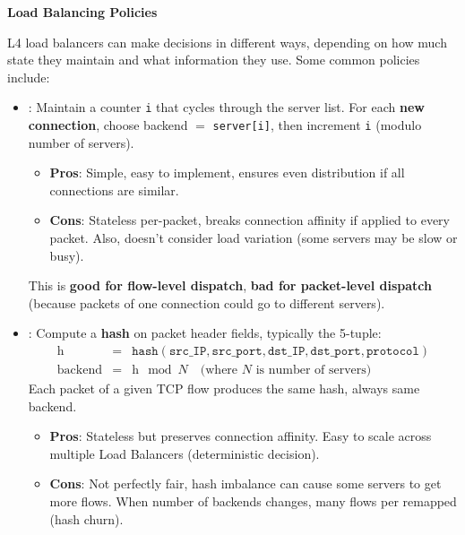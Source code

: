 \highspace
\begin{flushleft}
    \textcolor{Green3}{ \textbf{Load Balancing Policies}}
\end{flushleft}
L4 load balancers can make decisions in different ways, depending on how much state they maintain and what information they use. Some common policies include:
\begin{itemize}
    \item {}: Maintain a counter \texttt{i} that cycles through the server list. For each \textbf{new connection}, choose backend $=$ \texttt{server[i]}, then increment \texttt{i} (modulo number of servers).
    \begin{itemize}
        \item[\textcolor{Green3}{\faIcon{check}}] \textcolor{Green3}{\textbf{Pros}}: Simple, easy to implement, ensures even distribution if all connections are similar.
        \item[\textcolor{Red2}{\faIcon{times}}] \textcolor{Red2}{\textbf{Cons}}: Stateless per-packet, breaks connection affinity if applied to every packet. Also, doesn't consider load variation (some servers may be slow or busy).
    \end{itemize}
    This is \textbf{good for flow-level dispatch}, \textbf{bad for packet-level dispatch} (because packets of one connection could go to different servers).


    \item {}: Compute a \textbf{hash} on packet header fields, typically the 5-tuple:
    \begin{equation*}
        \begin{array}{rcl}
            \text{h} & = & \texttt{hash}\left(\texttt{src\_IP}, \texttt{src\_port}, \texttt{dst\_IP}, \texttt{dst\_port}, \texttt{protocol}\right) \\[.3em]
            \text{backend} & = & \text{h} \mod N \quad \text{(where $N$ is number of servers)}
        \end{array}
    \end{equation*}
    Each packet of a given TCP flow produces the same hash, always same backend.
    \begin{itemize}
        \item[\textcolor{Green3}{\faIcon{check}}] \textcolor{Green3}{\textbf{Pros}}: Stateless but preserves connection affinity. Easy to scale across multiple Load Balancers (deterministic decision).
        \item[\textcolor{Red2}{\faIcon{times}}] \textcolor{Red2}{\textbf{Cons}}: Not perfectly fair, hash imbalance can cause some servers to get more flows. When number of backends changes, many flows per remapped (hash churn).


\end{itemize}
\end{itemize}
